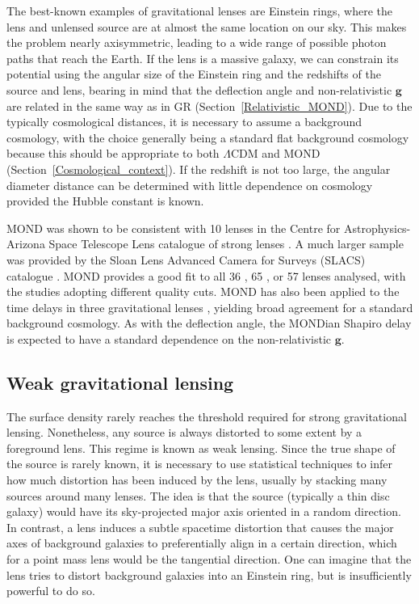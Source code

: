 \documentclass[fleqn,usenatbib,useAMS,onecolumn]{mnras} %
\begin{document}
The best-known examples of gravitational lenses are Einstein rings, where the lens and unlensed source are at almost the same location on our sky. This makes the problem nearly axisymmetric, leading to a wide range of possible photon paths that reach the Earth. If the lens is a massive galaxy, we can constrain its potential using the angular size of the Einstein ring and the redshifts of the source and lens, bearing in mind that the deflection angle and non-relativistic $\bm{g}$ are related in the same way as in GR (Section~\ref{Relativistic_MOND}). Due to the typically cosmological distances, it is necessary to assume a background cosmology, with the choice generally being a standard flat background cosmology because this should be appropriate to both $\Lambda$CDM and MOND (Section~\ref{Cosmological_context}). If the redshift is not too large, the angular diameter distance can be determined with little dependence on cosmology provided the Hubble constant is known.

MOND was shown to be consistent with 10 lenses in the Centre for Astrophysics-Arizona Space Telescope Lens \citep[CASTLES;][]{Lehar_2000} catalogue of strong lenses \citep{Chiu_2011}. A much larger sample was provided by the Sloan Lens Advanced Camera for Surveys (SLACS) catalogue \citep{Bolton_2006, Auger_2009}. MOND provides a good fit to all 36 \citep{Sanders_2008}, 65 \citep{Sanders_2014}, or 57 \citep{Tian_2017} lenses analysed, with the studies adopting different quality cuts. MOND has also been applied to the time delays in three gravitational lenses \citep{Tian_2013}, yielding broad agreement for a standard background cosmology. As with the deflection angle, the MONDian Shapiro delay \citep{Shapiro_1964} is expected to have a standard dependence on the non-relativistic $\bm{g}$.



\subsection{Weak gravitational lensing}
\label{Galaxy_galaxy_weak_lensing}

The surface density rarely reaches the threshold required for strong gravitational lensing. Nonetheless, any source is always distorted to some extent by a foreground lens. This regime is known as weak lensing. Since the true shape of the source is rarely known, it is necessary to use statistical techniques to infer how much distortion has been induced by the lens, usually by stacking many sources around many lenses. The idea is that the source (typically a thin disc galaxy) would have its sky-projected major axis oriented in a random direction. In contrast, a lens induces a subtle spacetime distortion that causes the major axes of background galaxies to preferentially align in a certain direction, which for a point mass lens would be the tangential direction. One can imagine that the lens tries to distort background galaxies into an Einstein ring, but is insufficiently powerful to do so.
\end{document}
